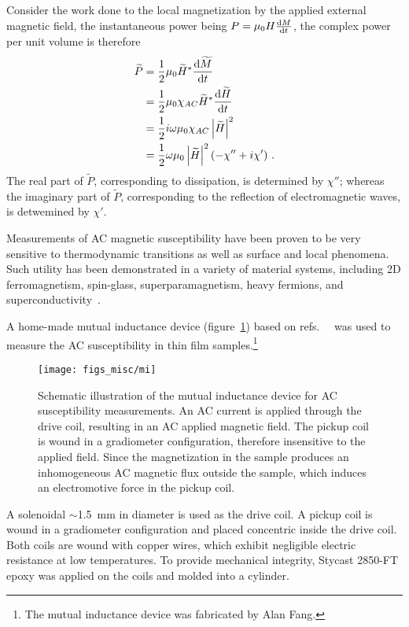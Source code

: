 Consider the work done to the local magnetization by the applied external magnetic field, the instantaneous power being $P = \mu_0H\frac{\mathop{}\!\mathrm{d} M}{\mathop{}\!\mathrm{d} t}$, the complex power per unit volume is therefore%
\begin{align}%
    \widetilde{P} &= \frac{1}{2}\mu_0 \widetilde{H}^* \frac{\diff \widetilde{M}}{\diff t}\nonumber\\
        &= \frac{1}{2}\mu_0\chi_{AC}\widetilde{H}^*\frac{\diff \widetilde{H}}{\diff t}\nonumber\\
        &= \frac{1}{2}i\omega\mu_0\chi_{AC}\left|\widetilde{H}\right|^2\nonumber\\
        &= \frac{1}{2}\omega\mu_0\left|\widetilde{H}\right|^2(-\chi''+i\chi')\label{eq:acm_power}~.
\end{align}%
The real part of $\widetilde{P}$, corresponding to dissipation, is determined by $\chi''$; whereas the imaginary part of $\widetilde{P}$, corresponding to the reflection of electromagnetic waves, is detwemined by $\chi'$.

Measurements of AC magnetic susceptibility have been proven to be very sensitive to thermodynamic transitions as well as surface and local phenomena. Such utility has been demonstrated in a variety of material systems, including 2D ferromagnetism, spin-glass, superparamagnetism, heavy fermions, and superconductivity~\cite{ac_nitroxide, ac_spin_glass, ac_superpara, Ando1994, Gegenwart2005, Schemm2014}.

A home-made mutual inductance device (figure~\ref{fig:mi_sketch}) based on refs.~~\cite{Jeanneret1989,Yazdani1993} was used to measure the AC susceptibility in thin film samples.\footnote{The mutual inductance device was fabricated by Alan Fang.} %
\begin{figure}[ht]%
	\centering%
    \texttt{[image: figs\_misc/mi]}%
    \caption[Schematic illustration of the mutual inductance device for AC susceptibility measurements]{\label{fig:mi_sketch}Schematic illustration of the mutual inductance device for AC susceptibility measurements. An AC current is applied through the drive coil, resulting in an AC applied magnetic field. The pickup coil is wound in a gradiometer configuration, therefore insensitive to the applied field. Since the magnetization in the sample produces an inhomogeneous AC magnetic flux outside the sample, which induces an electromotive force in the pickup coil.}%
\end{figure}%
%
A solenoidal $\sim$\SI{1.5}{mm} in diameter is used as the drive coil. A pickup coil is wound in a gradiometer configuration and placed concentric inside the drive coil. Both coils are wound with copper wires, which exhibit negligible electric resistance at low temperatures. To provide mechanical integrity, Stycast 2850-FT epoxy was applied on the coils and molded into a cylinder.

